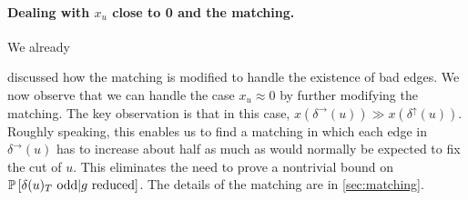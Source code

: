 \paragraph{Dealing with $x_u$ close to 0 and the matching.}
\hypertarget{xu-close-to-zero}{We already} discussed how the matching is modified to handle the existence of bad edges. We now observe that we can handle the case $x_u \approx 0$ by further modifying the matching. 
The key observation is that  in this case, $x(\delta ^\rightarrow(u))\gg x(\delta ^\uparrow(u))$. Roughly speaking, this enables us to find a matching in which 
each edge in $\delta^\rightarrow(u)$ has to increase about half as much as would normally be expected to fix the cut of $u$. This eliminates the need to prove a nontrivial bound on $\P{\delta(u)_T\text{ odd} | g\text{ reduced}}$. The details of the matching are in \cref{sec:matching}.





